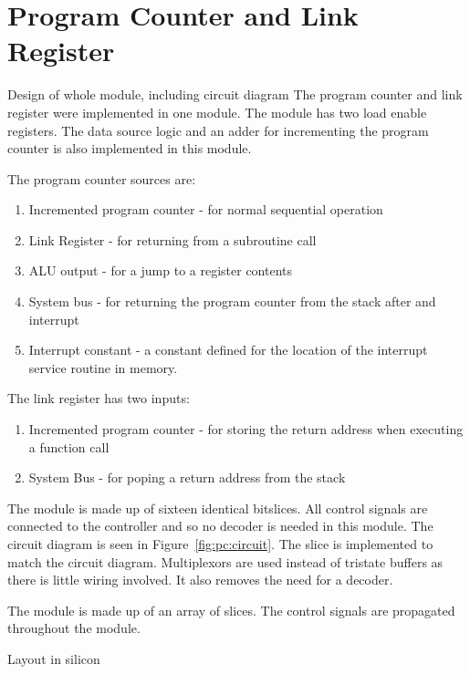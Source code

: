 
\section{Program Counter and Link Register}


Design of whole module, including circuit diagram
The program counter and link register were implemented in one module.
The module has two load enable registers. 
The data source logic and an adder for incrementing the program counter is also implemented in this module.

The program counter sources are:
\begin{enumerate}
\item Incremented program counter - for normal sequential operation
\item Link Register - for returning from a subroutine call
\item ALU output - for a jump to a register contents
\item System bus - for returning the program counter from the stack after and interrupt
\item Interrupt constant - a constant defined for the location of the interrupt service routine in memory.
\end{enumerate}

The link register has two inputs:
\begin{enumerate}
\item Incremented program counter - for storing the return address when executing a function call
\item System Bus - for poping a return address from the stack 
\end{enumerate}

The module is made up of sixteen identical bitslices. 
All control signals are connected to the controller and so no decoder is needed in this module.
The circuit diagram is seen in Figure~\ref{fig:pc:circuit}.
The slice is implemented to match the circuit diagram. 
Multiplexors are used instead of tristate buffers as there is little wiring involved. 
It also removes the need for a decoder.

The module is made up of an array of slices. 
The control signals are propagated throughout the module. 


Layout in silicon
